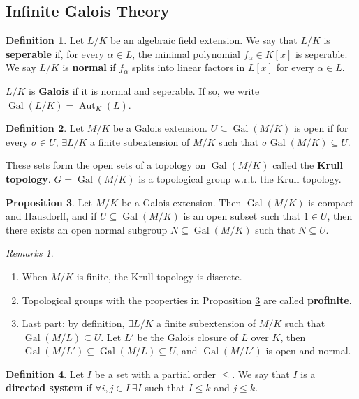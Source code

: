 \documentclass[a4paper]{article}
\theoremstyle{definition}
\newtheorem{definition}{Definition}
\theoremstyle{default}
\newtheorem{prop}[definition]{Proposition}
\theoremstyle{remark}
\newtheorem*{remarks}{Remarks}
\DeclareMathOperator{\Aut}{Aut}
\DeclareMathOperator{\Gal}{Gal}
\begin{document}
\subsection{Infinite Galois Theory}
\begin{definition}
	Let $L/K$ be an algebraic field extension.
	We say that $L/K$ is \textbf{seperable} if,
	for every $\alpha \in L$,
	the minimal polynomial $f_\alpha \in K[x]$ is seperable.	
	We say $L/K$ is \textbf{normal} if
	$f_\alpha$ splits into linear factors in $L[x]$ for every $\alpha \in L$.
	
	$L/K$ is \textbf{Galois} if it is normal and seperable.
	If so, we write $\Gal(L/K) = \Aut_K(L)$.
\end{definition}

\begin{definition}
	Let $M/K$ be a Galois extension.
	$U \subseteq \Gal(M/K)$ is open if for every $\sigma \in U$,
	$\exists L/K$ a finite subextension of $M/K$ such that $\sigma\Gal(M/K) \subseteq U$.
	
	These sets form the open sets of a topology on $\Gal(M/K)$ called the \textbf{Krull topology}.
	$G=\Gal(M/K)$ is a topological group w.r.t. the Krull topology.
\end{definition}

\begin{prop}
	Let $M/K$ be a Galois extension.
	Then $\Gal(M/K)$ is compact and Hausdorff,
	and if $U \subseteq \Gal(M/K)$ is an open subset such that $1 \in U$,
	then there exists an open normal subgroup $N \subseteq \Gal(M/K)$ such that $N \subseteq U$.
	\label{95}
\end{prop}

\begin{remarks}
	\begin{enumerate}
		\item When $M/K$ is finite, the Krull topology is discrete.
		\item Topological groups with the properties in Proposition \ref{95} are called \textbf{profinite}.
		\item Last part: by definition, $\exists L/K$ a finite subextension of $M/K$ such that $\Gal(M/L) \subseteq U$.
		Let $L'$ be the Galois closure of $L$ over $K$,
		then $\Gal(M/L') \subseteq \Gal(M/L) \subseteq U$,
		and $\Gal(M/L')$ is open and normal.
	\end{enumerate}
\end{remarks}

\begin{definition}
	Let $I$ be a set with a partial order $\leq$.
	We say that $I$ is a \textbf{directed system} if
	$\forall i,j \in I\ \exists I$ such that $I \leq k$ and $j \leq k$.
\end{definition}
\end{document}
